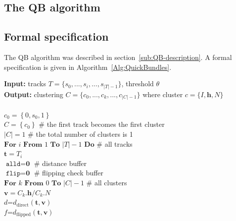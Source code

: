 \documentclass[preprint,authoryear,a4paper,10pt,onecolumn]{elsarticle}
\begin{document}
\begin{appendices}

\section{The QB algorithm\label{Sec:QB-Algorithm}}

\subsection{Formal specification\label{sub:QB-specification}}

The QB algorithm was described in section~\ref{sub:QB-description}. A formal
specification is given in Algorithm~\ref{Alg:QuickBundles}.

\begin{algorithm}
\textbf{Input:} tracks $T=\{s_{0},...,s_{i},...,s_{|T|-1}\}$, threshold $\theta $\\
\textbf{Output:} clustering $C=\{c_{0},...,c_{k},...,c_{|C|-1}\}$ where cluster $c=\{I,\mathbf{h},N\}$\\
\\
$c_{0}=\left\{0,s_{0},1\right\}$\\
$C=\left\{c_{0}\right\}$ \# the first track becomes the first cluster\\
$|C|=1$ \# the total number of clusters is 1 \\
$\textbf{For}$ $i$ $\textbf{From}$ $1$ $\textbf{To}$ $|T|-1$ $\textbf{Do}$ \# all tracks\\
\hspace*{2em} $\textbf{t}=T_{i}$\\
\hspace*{2em} $\texttt{alld}=\textbf{0}$ \# distance buffer\\
\hspace*{2em} $\texttt{flip}=\textbf{0}$ \# flipping check buffer\\
\hspace*{2em} $\textbf{For}$ $k$ $\textbf{From}$ $0$ $\textbf{To}$ $|C|-1$ \# all clusters\\
\hspace*{4em} $\mathbf{v}=C_{k}.\mathbf{h}/C_{k}.N$\\ 
\hspace*{4em} $d$=$d_{\textrm{direct}}(\mathbf{t},\mathbf{v})$\\
\hspace*{4em} $f$=$d_{\textrm{flipped}}(\mathbf{t},\mathbf{v})$\\

\end{algorithm}
\end{appendices}
\end{document}
